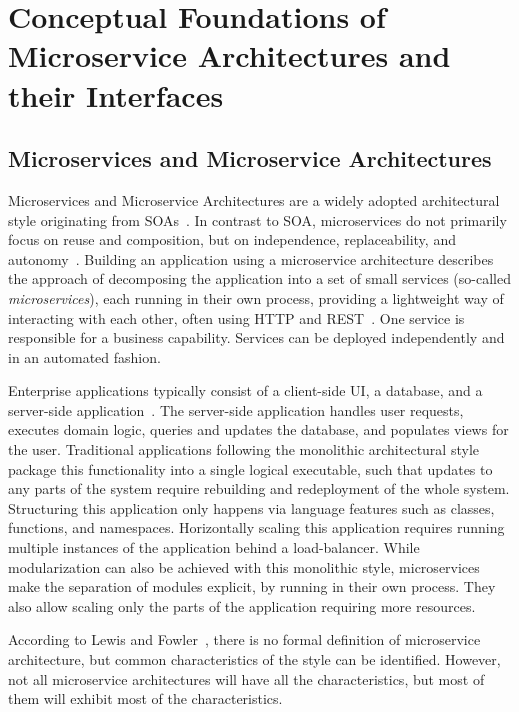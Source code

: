 \section{Conceptual Foundations of Microservice Architectures and their Interfaces}\label{sec:foundations}

\subsection{Microservices and Microservice Architectures}

Microservices and Microservice Architectures are a widely adopted architectural style originating from \acp{SOA}~\cite{Mazzara2020}.
In contrast to \ac{SOA}, microservices do not primarily focus on reuse and composition, but on independence, replaceability, and autonomy~\cite{Baresi2020}.
Building an application using a microservice architecture describes the approach of decomposing the application into a set of small services (so-called \textit{microservices}), each running in their own process, providing a lightweight way of interacting with each other, often using \ac{HTTP} and \ac{REST}~\cite{Lewis2014}.
One service is responsible for a business capability.
Services can be deployed independently and in an automated fashion.

Enterprise applications typically consist of a client-side \ac{UI}, a database, and a server-side application~\cite{Lewis2014}.
The server-side application handles user requests, executes domain logic, queries and updates the database, and populates views for the user.
Traditional applications following the monolithic architectural style package this functionality into a single logical executable, such that updates to any parts of the system require rebuilding and redeployment of the whole system.
Structuring this application only happens via language features such as classes, functions, and namespaces.
Horizontally scaling this application requires running multiple instances of the application behind a load-balancer.
While modularization can also be achieved with this monolithic style, microservices make the separation of modules explicit, by running in their own process.
They also allow scaling only the parts of the application requiring more resources.

According to Lewis and Fowler~\cite{Lewis2014}, there is no formal definition of microservice architecture, but common characteristics of the style can be identified.
However, not all microservice architectures will have all the characteristics, but most of them will exhibit most of the characteristics.

